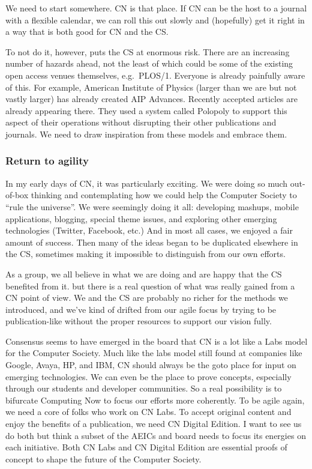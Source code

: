 \documentclass[11pt,english]{luclet}
\begin{document}
We need to start somewhere. CN is that place. If CN can be the host to a
journal with a flexible calendar, we can roll this out slowly and
(hopefully) get it right in a way that is both good for CN and the CS.

To not do it, however, puts the CS at enormous risk. There are an
increasing number of hazards ahead, not the least of which could be some
of the existing open access venues themselves, e.g.~PLOS/1. Everyone is
already painfully aware of this. For example, American Institute of
Physics (larger than we are but not vastly larger) has already created
AIP Advances. Recently accepted articles are already appearing there.
They used a system called Polopoly to support this aspect of their
operations without disrupting their other publications and journals. We
need to draw inspiration from these models and embrace them.

\subsubsection{Return to agility}

In my early days of CN, it was particularly exciting. We were doing so
much out-of-box thinking and contemplating how we could help the
Computer Society to ``rule the universe''. We were seemingly doing it
all: developing mashups, mobile applications, blogging, special theme
issues, and exploring other emerging technologies (Twitter, Facebook,
etc.) And in most all cases, we enjoyed a fair amount of success. Then
many of the ideas began to be duplicated elsewhere in the CS, sometimes
making it impossible to distinguish from our own efforts.

As a group, we all believe in what we are doing and are happy that the
CS benefited from it. but there is a real question of what was really
gained from a CN point of view. We and the CS are probably no richer for
the methods we introduced, and we've kind of drifted from our agile
focus by trying to be publication-like without the proper resources to
support our vision fully.

Consensus seems to have emerged in the board that CN is a lot like a
Labs model for the Computer Society. Much like the labs model still
found at companies like Google, Avaya, HP, and IBM, CN should always be
the goto place for input on emerging technologies. We can even be the
place to prove concepts, especially through our students and developer
communities. So a real possibility is to bifurcate Computing Now to
focus our efforts more coherently. To be agile again, we need a core of
folks who work on CN Labs. To accept original content and enjoy the
benefits of a publication, we need CN Digital Edition. I want to see us
do both but think a subset of the AEICs and board needs to focus its
energies on each initiative. Both CN Labs and CN Digital Edition are
essential proofs of concept to shape the future of the Computer Society.
\end{document}
